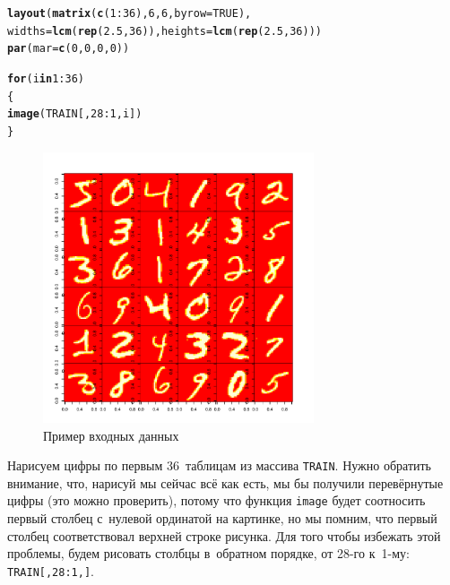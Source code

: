 \documentclass[final,pdftex]{../../template/epsilonj}\usepackage[]{graphicx}\usepackage[]{color}
\makeatletter
\newcommand{\hlnum}[1]{\textcolor[rgb]{0.686,0.059,0.569}{#1}}%
\newcommand{\hlopt}[1]{\textcolor[rgb]{0,0,0}{#1}}%
\newcommand{\hlstd}[1]{\textcolor[rgb]{0.345,0.345,0.345}{#1}}%
\newcommand{\hlkwa}[1]{\textcolor[rgb]{0.161,0.373,0.58}{\textbf{#1}}}%
\newcommand{\hlkwc}[1]{\textcolor[rgb]{0.333,0.667,0.333}{#1}}%
\newcommand{\hlkwd}[1]{\textcolor[rgb]{0.737,0.353,0.396}{\textbf{#1}}}%
\newenvironment{kframe}{%
 \def\at@end@of@kframe{}%
 \ifinner\ifhmode%
  \def\at@end@of@kframe{\end{minipage}}%
  \begin{minipage}{\columnwidth}%
 \fi\fi%
 \def\FrameCommand##1{\hskip\@totalleftmargin \hskip-\fboxsep
 \colorbox{shadecolor}{##1}\hskip-\fboxsep
     \hskip-\linewidth \hskip-\@totalleftmargin \hskip\columnwidth}%
 \MakeFramed {\advance\hsize-\width
   \@totalleftmargin\z@ \linewidth\hsize
   \@setminipage}}%
 {\par\unskip\endMakeFramed%
 \at@end@of@kframe}
\newenvironment{knitrout}{}{} %
\makeatother
\begin{document}
\begin{knitrout}
\color{fgcolor}\begin{kframe}
\begin{alltt}
\hlkwd{layout}\hlstd{(}\hlkwd{matrix}\hlstd{(}\hlkwd{c}\hlstd{(}\hlnum{1}\hlopt{:}\hlnum{36}\hlstd{),} \hlnum{6}\hlstd{,} \hlnum{6}\hlstd{,} \hlkwc{byrow} \hlstd{=} \hlnum{TRUE}\hlstd{),}
   \hlkwc{widths} \hlstd{=} \hlkwd{lcm}\hlstd{(}\hlkwd{rep}\hlstd{(}\hlnum{2.5}\hlstd{,}\hlnum{36}\hlstd{)),} \hlkwc{heights} \hlstd{=} \hlkwd{lcm}\hlstd{(}\hlkwd{rep}\hlstd{(}\hlnum{2.5}\hlstd{,}\hlnum{36}\hlstd{)))}
\hlkwd{par}\hlstd{(}\hlkwc{mar}\hlstd{=}\hlkwd{c}\hlstd{(}\hlnum{0}\hlstd{,}\hlnum{0}\hlstd{,}\hlnum{0}\hlstd{,}\hlnum{0}\hlstd{))}

\hlkwa{for}\hlstd{(i} \hlkwa{in} \hlnum{1}\hlopt{:}\hlnum{36}\hlstd{)}
  \hlstd{\{}
\hlkwd{image}\hlstd{(TRAIN[,}\hlnum{28}\hlopt{:}\hlnum{1}\hlstd{,i])}
  \hlstd{\}}
\end{alltt}
\end{kframe}

\begin{figure}[hbt]
	\centering
	\includegraphics[width=8cm]{figure/unnamed-chunk-4-1}
	\caption{Пример входных данных}
\end{figure} 

\end{knitrout}

Нарисуем цифры по первым 36~таблицам из массива \texttt{TRAIN}. 
Нужно обратить внимание, что, нарисуй мы сейчас всё как есть, мы бы получили перевёрнутые цифры (это можно проверить), потому что функция \texttt{image} будет соотносить первый столбец с~нулевой ординатой на картинке, но мы помним, что первый столбец соответствовал верхней строке рисунка. 
Для того чтобы избежать этой проблемы, будем рисовать столбцы в~обратном порядке, от 28-го к~1-му: \texttt{TRAIN[,28:1,]}.
\end{document}
